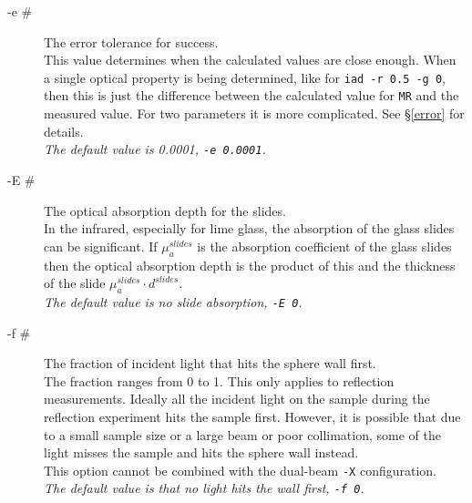 \documentclass{article}
\begin{document}
\begin{description}
    \item[-e \#] The error tolerance for success.\\[1mm]
                 This value determines when the calculated values are close enough. When a single optical
                 property is being determined, like for \texttt{iad -r 0.5 -g 0}, then this is just the
                 difference between the calculated value for \texttt{MR} and the measured value.  For two
                 parameters it is more complicated.  See \S \ref{error} for details.\\[1mm]
                 \textit{The default value is 0.0001, \texttt{-e 0.0001}.}
                 
    \item[-E \#] The optical absorption depth for the slides.\\[1mm]
                 In the infrared, especially for lime glass, the absorption of the glass slides can be
                 significant.  If $\mu_a^{slides}$ is the absorption coefficient of the glass slides
                 then the optical absorption depth is the product of this and the thickness of the
                 slide $\mu_a^{slides}\cdot d^{slides}$.\\[1mm]
                 \textit{The default value is no slide absorption, \texttt{-E 0}.}

    \item[-f \#] The fraction of incident light that hits the sphere wall first.\\[1mm]
                 The fraction ranges from 0 to 1.  This only applies to reflection measurements.  Ideally all the incident
                 light on the sample during the reflection experiment hits the sample first.  However,
                 it is possible that due to a small sample size or a large beam or poor collimation,
                 some of the light misses the sample and hits the sphere wall instead. \\[1mm]
                 This option cannot be combined with the dual-beam \texttt{-X} configuration.\\[1mm]
                 \textit{The default value is that no light hits the wall first, \texttt{-f 0}.}
    

\end{description}
\end{document}
